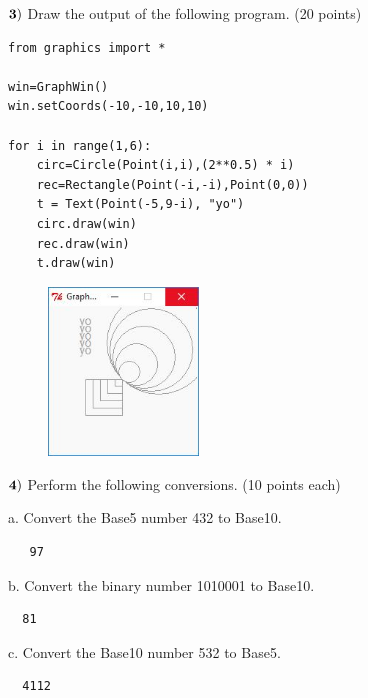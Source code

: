 \documentclass{article}
\begin{document}
  
  
    \newpage
  
  $\bf{3)}$  Draw the output of the following program. (20 points)
  \begin{verbatim}
from graphics import *

win=GraphWin()
win.setCoords(-10,-10,10,10)

for i in range(1,6):
    circ=Circle(Point(i,i),(2**0.5) * i)
    rec=Rectangle(Point(-i,-i),Point(0,0))
    t = Text(Point(-5,9-i), "yo")
    circ.draw(win)
    rec.draw(win)
    t.draw(win)
    \end{verbatim}
    \begin{figure}
    \includegraphics[width=40mm]{midterm_makeup.jpg}
    \end{figure}
   
  \newpage
  
  $\bf{4)}$ Perform the following conversions. (10 points each)
  \vspace{0.5cm}
  
   a. Convert the Base5 number 432 to Base10. 
   \begin{verbatim}
   97
   \end{verbatim}
  
  b. Convert the binary number 1010001 to Base10. 
  \begin{verbatim}
  81
  \end{verbatim}
  c. Convert the Base10 number 532 to Base5.
  \begin{verbatim}
  4112
  \end{verbatim}
  

 
\end{document}

